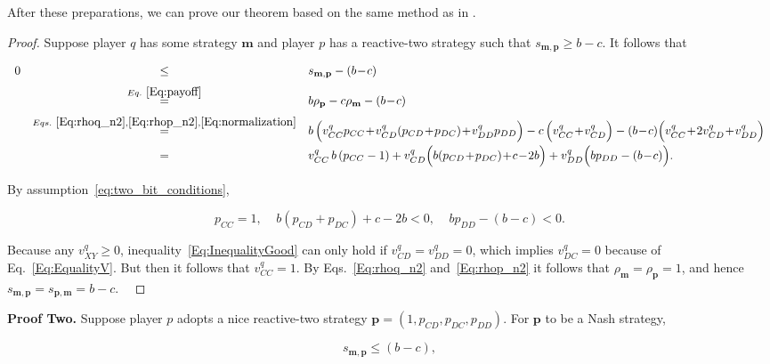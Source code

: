 \documentclass{article}
\theoremstyle{definition}
\begin{document}
After these preparations, we can prove our theorem based on the same method as in \citet{akin:EGADS:2016}.
 
\begin{proof}
Suppose player $q$ has some strategy $\mathbf{m}$ and player $p$ has a reactive-two
strategy such that $s_{\mathbf{m}, \mathbf{p}} \ge b\!-\!c$. It follows that

\begin{equation} \label{Eq:InequalityGood}
\begin{array}{rcl}
0 	&\le	&s_{\mathbf{m}, \mathbf{p}}-(b\!-\!c)\\[0.2cm]
	&\stackrel{Eq.~\eqref{Eq:payoff}}{=}	&b\rho_\mathbf{p} - c\rho_\mathbf{m}-(b\!-\!c)\\[0.2cm]
	&\stackrel{Eqs.~\eqref{Eq:rhoq_n2}, \eqref{Eq:rhop_n2}, \eqref{Eq:normalization}}{=}	&b\,\Big( v^q_{CC} p_{CC} \!+\!  v^q_{CD}(p_{CD}\!+\!p_{DC}) \!+\! v^q_{DD} p_{DD}\Big) 
		- c\,\Big(v^q_{CC} \!+\! v^q_{CD}\Big) - (b\!-\!c)\Big(v^q_{CC} \!+\!  2v^q_{CD} \!+\! v^q_{DD}\Big)\\[0.2cm]
	&=	&v^q_{CC} \,b\,(p_{CC}-1) + v^q_{CD}\Big(b(p_{CD}\!+\!p_{DC})\!+\!c\!-\!2b\Big) + v^q_{DD}\Big(bp_{DD}-(b\!-\!c)\Big).
\end{array}
\end{equation}

By assumption~\eqref{eq:two_bit_conditions},

\begin{equation}
p_{CC}=1,~~~~~b(p_{CD}\!+\!p_{DC})\!+\!c\!-\!2b<0,~~~~~bp_{DD}-(b\!-\!c)<0.
\end{equation}

Because any $v^q_{XY}\!\ge\!0$, inequality~\eqref{Eq:InequalityGood} can only
hold if $v^q_{CD}\!=\!v^q_{DD}\!=\!0$, which implies $v^q_{DC}\!=\!0$ because of
Eq.~\eqref{Eq:EqualityV}. But then it follows that $v^q_{CC}\!=\!1$. By
Eqs.~\eqref{Eq:rhoq_n2} and~\eqref{Eq:rhop_n2} it follows that
$\rho_\mathbf{m}\!=\!\rho_\mathbf{p}\!=\!1$, and hence
$s_{\mathbf{m}, \mathbf{p}}\!=\!s_{\mathbf{p}, \mathbf{m}}\!=\!b\!-\!c$. 
\
\end{proof}

{\bf Proof Two.} Suppose player $p$ adopts a nice reactive-two strategy
$\mathbf{p}\!=\!(1, p_{CD}, p_{DC}, p_{DD})$. For $\mathbf{p}$ to be a Nash
strategy,

\begin{equation}\label{Eq:NashReactive}
  s_{\mathbf{m}, \mathbf{p}} \leq (b - c),
\end{equation}
\end{document}
